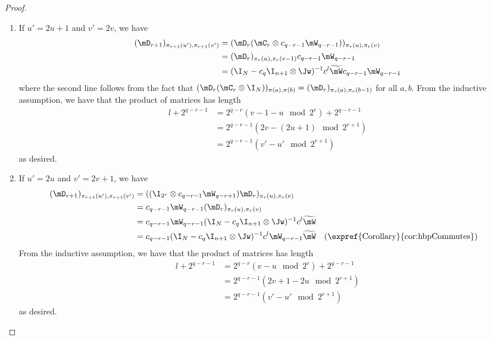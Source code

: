\begin{proof}
\begin{enumerate}
    \item If $u'=2u+1$ and $v'=2v$, we have
    \begin{align*}
        (\mD_{r+1})_{\pi_{r+1}(u'),\pi_{r+1}(v')} &=  (\mD_{r}(\mC_{r} \otimes c_{q-r-1}\mW_{q-r-1}))_{\pi_r(u),\pi_r(v)}\\
        &= (\mD_{r})_{\pi_r(u),\pi_r(v-1)}c_{q-r-1}\mW_{q-r-1}\\
        &= (\I_N-c_q\I_{n+1}\otimes\Jw)^{-1}c^{l}\widetilde{\mW}c_{q-r-1}\mW_{q-r-1}
    \end{align*}
    where the second line follows from the fact that $(\mD_{r}(\mC_r\otimes \I_N))_{\pi(a),\pi(b)}=(\mD_{r})_{\pi_r(a),\pi_r(b-1)}$ for all $a,b$. From the inductive assumption, we have that the product of matrices has length 
    \begin{align*}
        l+2^{q-r-1} &=2^{q-r}(v-1-u \mod 2^{r})+2^{q-r-1}\\
        &=2^{q-r-1}(2v-(2u+1) \mod 2^{r+1})\\
        &= 2^{q-r-1}(v'-u' \mod 2^{r+1})
    \end{align*} 
    as desired.
    
    \item If $u'=2u$ and $v'=2v+1$, we have
    \begin{align*}
        (\mD_{r+1})_{\pi_{r+1}(u'),\pi_{r+1}(v')} &= ((\I_{2^r}\otimes c_{q-r-1}\mW_{q-r+1})\mD_{r})_{\pi_r(u),\pi_r(v)}\\ 
        &= c_{q-r-1}\mW_{q-r-1}(\mD_{r})_{\pi_r(u),\pi_r(v)}\\
        &=c_{q-r-1}\mW_{q-r-1}(\I_N-c_q\I_{n+1}\otimes\Jw)^{-1}c^{l}\widetilde{\mW}\\
        &= c_{q-r-1}(\I_N-c_q\I_{n+1}\otimes\Jw)^{-1}c^{l}\mW_{q-r-1}\widetilde{\mW} && (\text{\expref{Corollary}{cor:hbpCommutes}})
    \end{align*}
    From the inductive assumption, we have that the product of matrices has length
    \begin{align*}
        l+2^{q-r-1} &= 2^{q-r}(v-u \mod 2^{r})+2^{q-r-1}\\
        &=2^{q-r-1}(2v+1-2u \mod 2^{r+1})\\
        &=2^{q-r-1}(v'-u' \mod 2^{r+1})
    \end{align*} 
    as desired.
    

\end{enumerate}
\end{proof}
